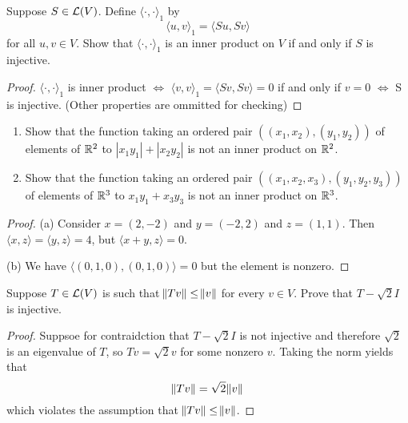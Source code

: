 \documentclass{extarticle}
\begin{document}
\begin{problem}{2}
    Suppose \(S \in \mathcal{L}(V)\). Define \(\langle \cdot, \cdot \rangle_1\) by 
    \[\langle u,v \rangle_1 = \langle Su,Sv \rangle\]
    for all \(u, v \in V\). Show that \(\langle \cdot,\cdot \rangle_1\) is an inner product on 
    \(V\) if and only if \(S\) is injective.
\end{problem}

\begin{proof}
    \(\langle \cdot,\cdot \rangle_1\) is inner product \(\Leftrightarrow\) 
    \(\langle v,v \rangle_1 = \langle Sv,Sv \rangle = 0\) if and only if \(v = 0\) \(\Leftrightarrow\) 
    S is injective. (Other properties are ommitted for checking)
\end{proof}


\begin{problem}{3}
    \begin{enumerate}[label=(\alph*)]
        \item Show that the function taking an ordered pair \(((x_1, x_2), (y_1, y_2))\) of elements of 
        \(\mathbb{R}^2\) to \(|x_1 y_1| + |x_2 y_2|\) is not an inner product on \(\mathbb{R}^2\).
        \item Show that the function taking an ordered pair \(((x_1, x_2, x_3), (y_1, y_2, y_3))\) of 
        elements of \(\mathbb{R}^3\) to \(x_1y_1 + x_3y_3\) is not an inner product on \(\mathbb{R}^3\).
    \end{enumerate}
\end{problem}

\begin{proof}
(a) Consider \(x = (2, -2)\) and \(y = (-2, 2)\) and \(z = (1, 1)\). Then \(\langle x,z \rangle 
= \langle y,z \rangle = 4\), but \(\langle x + y,z \rangle = 0\).

(b) We have \(\langle (0, 1, 0),(0, 1, 0) \rangle = 0\) but the element is nonzero.
\end{proof}


\begin{problem}{4}
    Suppose \(T \in \mathcal{L}(V)\) is such that \(\norm{Tv} \leq \norm{v}\) for every \(v \in V\). Prove that 
    \(T - \sqrt{2}I\) is injective.
\end{problem}

\begin{proof}
Suppsoe for contraidction that \( T - \sqrt{2} I \) is not injective and therefore \(\sqrt{2}\) is an eigenvalue 
of \(T\), so \(Tv = \sqrt{2}v\) for some nonzero \(v\). Taking the norm yields that  
\[\norm{Tv} = \sqrt{2} \norm{v}\]
which violates the assumption that \(\norm{Tv} \leq \norm{v}\).
\end{proof}
\end{document}
